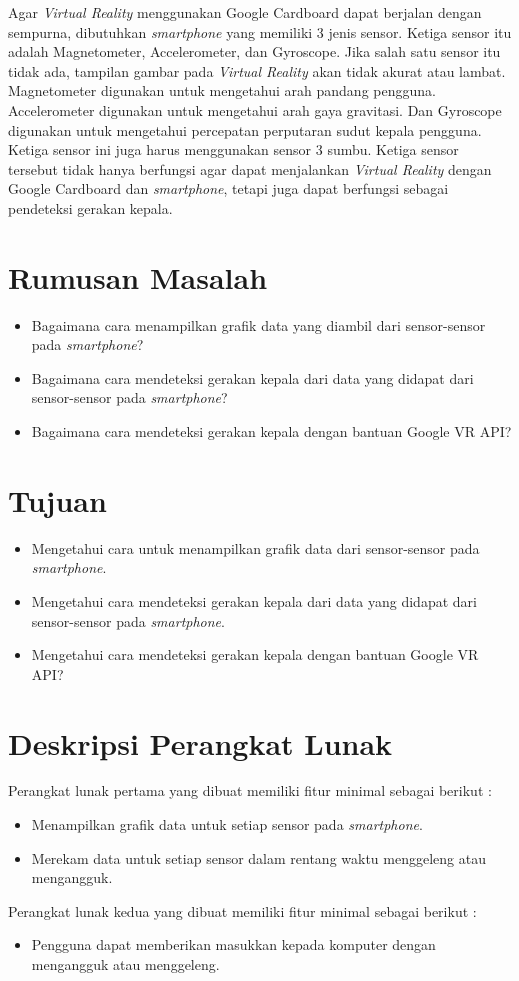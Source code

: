 \documentclass[a4paper,twoside]{article}
\begin{document}
Agar \textit{Virtual Reality} menggunakan Google Cardboard dapat berjalan dengan sempurna, dibutuhkan \textit{smartphone} yang memiliki 3 jenis sensor. Ketiga sensor itu adalah Magnetometer, Accelerometer, dan Gyroscope. Jika salah satu sensor itu tidak ada, tampilan gambar pada \textit{Virtual Reality} akan tidak akurat atau lambat. Magnetometer digunakan untuk mengetahui arah pandang pengguna. Accelerometer digunakan untuk mengetahui arah gaya gravitasi. Dan Gyroscope digunakan untuk mengetahui percepatan perputaran sudut kepala pengguna. Ketiga sensor ini juga harus menggunakan sensor 3 sumbu. Ketiga sensor tersebut tidak hanya berfungsi agar dapat menjalankan \textit{Virtual Reality} dengan Google Cardboard dan \textit{smartphone}, tetapi juga dapat berfungsi sebagai pendeteksi gerakan kepala.

\section{Rumusan Masalah}

\begin{itemize}
	\item Bagaimana cara menampilkan grafik data yang diambil dari sensor-sensor pada \textit{smartphone}?
	\item Bagaimana cara mendeteksi gerakan kepala dari data yang didapat dari sensor-sensor pada \textit{smartphone}?
	\item Bagaimana cara mendeteksi gerakan kepala dengan bantuan Google VR API?
\end{itemize}

\section{Tujuan}

\begin{itemize}
	\item Mengetahui cara untuk menampilkan grafik data dari sensor-sensor pada \textit{smartphone}.
	\item Mengetahui cara mendeteksi gerakan kepala dari data yang didapat dari sensor-sensor pada \textit{smartphone}.
	\item Mengetahui cara mendeteksi gerakan kepala dengan bantuan Google VR API?
\end{itemize}
\section{Deskripsi Perangkat Lunak}
Perangkat lunak pertama yang dibuat memiliki fitur minimal sebagai berikut :
\begin{itemize}
\item	Menampilkan grafik data untuk setiap sensor pada \textit{smartphone}.
\item	Merekam data untuk setiap sensor dalam rentang waktu menggeleng atau mengangguk.
\end{itemize}
Perangkat lunak kedua yang dibuat memiliki fitur minimal sebagai berikut :
\begin{itemize}
\item	Pengguna dapat memberikan masukkan kepada komputer dengan mengangguk atau menggeleng.
\end{itemize}
\end{document}
